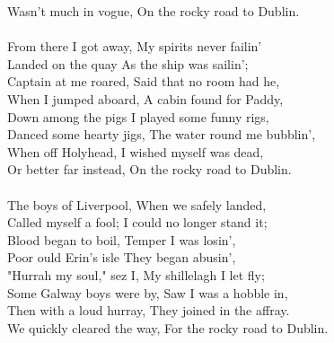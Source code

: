 Wasn't much in vogue, On the rocky road to Dublin. \\
\\
From there I got away, My spirits never failin'\\
Landed on the quay As the ship was sailin';\\
Captain at me roared, Said that no room had he,\\
When I jumped aboard, A cabin found for Paddy,\\
Down among the pigs I played some funny rigs,\\
Danced some hearty jigs, The water round me bubblin',\\
When off Holyhead, I wished myself was dead,\\
Or better far instead, On the rocky road to Dublin. \\
\\
The boys of Liverpool, When we safely landed,\\
Called myself a fool; I could no longer stand it;\\
Blood began to boil, Temper I was losin',\\
Poor ould Erin's isle They began abusin',\\
"Hurrah my soul," sez I, My shillelagh I let fly;\\
Some Galway boys were by, Saw I was a hobble in,\\
Then with a loud hurray, They joined in the affray.\\
We quickly cleared the way, For the rocky road to Dublin. \\
\\
\\
\\
\\
